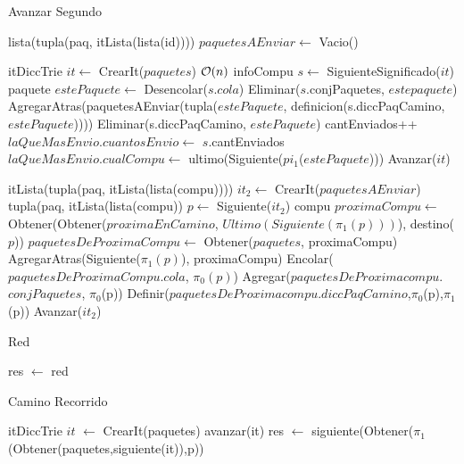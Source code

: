 \begin{Algoritmos}
\begin{algorithm}
\caption{Avanzar Segundo}
\begin{algorithmic}[1]
  
  \State lista(tupla(paq, itLista(lista(id)))) $paquetesAEnviar \gets$ Vacio()
  
  \State itDiccTrie $it \gets$ CrearIt($paquetes$)
   \Comment $\mathcal{O}(n)$
  	\State infoCompu $s \gets$ SiguienteSignificado($it$) 
  		\State paquete $estePaquete \gets$ Desencolar($s$.$cola$)
  		\State Eliminar($s$.conjPaquetes, $estepaquete$)
		\State AgregarAtras(paquetesAEnviar(tupla($estePaquete$, definicion(s.diccPaqCamino, $estePaquete$))))
		\State Eliminar(s.diccPaqCamino, $estePaquete$) 
		\State cantEnviados++
		   \State $laQueMasEnvio.cuantosEnvio \gets$ $s$.cantEnviados
		   \State $laQueMasEnvio.cualCompu \gets$ ultimo(Siguiente($pi_1$($estePaquete$)))
		\EndIf
	\EndIf
	\State Avanzar($it$)
  \EndWhile 
   
  \State itLista(tupla(paq, itLista(lista(compu)))) $it_2 \gets$ CrearIt($paquetesAEnviar$)
      \State tupla(paq, itLista(lista(compu)) $p \gets$ Siguiente($it_2$)
      \State compu $proximaCompu \gets$ Obtener(Obtener($proximaEnCamino$, $Ultimo(Siguiente(\pi_1(p)))$), destino($p$))
	\State $paquetesDeProximaCompu \gets$ Obtener($paquetes$, proximaCompu)
      	\State AgregarAtras(Siguiente($\pi_1(p)$), proximaCompu)
      	\State Encolar($paquetesDeProximaCompu$.$cola$, $\pi_0(p)$)
      	\State Agregar($paquetesDeProximacompu$.$conjPaquetes$, $\pi_0$(p))
	\State Definir($paquetesDeProximacompu.diccPaqCamino$,$\pi_0$(p),$\pi_1$(p))      
      \EndIf
      \State Avanzar($it_2$)
  \EndWhile
 
 \EndProcedure
\end{algorithmic}
\end{algorithm}



\begin{algorithm}
\caption{Red}
\begin{algorithmic}[1]
 \State res $\gets$ red
 \EndProcedure
\end{algorithmic}
\end{algorithm}

\begin{algorithm}
\caption{Camino Recorrido}
\begin{algorithmic}[1]
   \State itDiccTrie $it$ $\gets$ CrearIt(paquetes)
   \State avanzar(it)
   \EndWhile
   \State res $\gets$ siguiente(Obtener($\pi_1$(Obtener(paquetes,siguiente(it)),p))
  \EndProcedure
\end{algorithmic}
\end{algorithm}



\end{Algoritmos}
